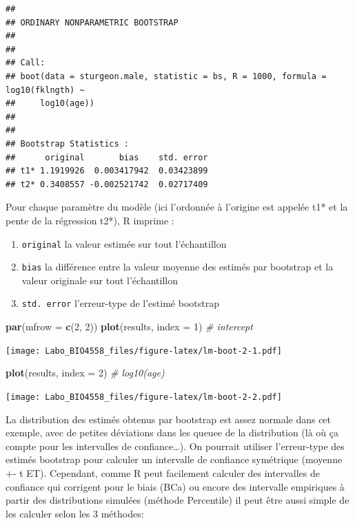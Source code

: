 \documentclass[
  12pt,
]{book}
\newenvironment{Shaded}{\begin{snugshade}}{\end{snugshade}}
\newcommand{\CommentTok}[1]{\textcolor[rgb]{0.56,0.35,0.01}{\textit{#1}}}
\newcommand{\DataTypeTok}[1]{\textcolor[rgb]{0.13,0.29,0.53}{#1}}
\newcommand{\DecValTok}[1]{\textcolor[rgb]{0.00,0.00,0.81}{#1}}
\newcommand{\KeywordTok}[1]{\textcolor[rgb]{0.13,0.29,0.53}{\textbf{#1}}}
\newcommand{\NormalTok}[1]{#1}
\providecommand{\tightlist}{%
  \setlength{\itemsep}{0pt}\setlength{\parskip}{0pt}}
\begin{document}
\begin{verbatim}
## 
## ORDINARY NONPARAMETRIC BOOTSTRAP
## 
## 
## Call:
## boot(data = sturgeon.male, statistic = bs, R = 1000, formula = log10(fklngth) ~ 
##     log10(age))
## 
## 
## Bootstrap Statistics :
##      original       bias    std. error
## t1* 1.1919926  0.003417942  0.03423899
## t2* 0.3408557 -0.002521742  0.02717409
\end{verbatim}

Pour chaque paramètre du modèle (ici l'ordonnée à l'origine est
appelée t1* et la pente de la régression t2*), R imprime :

\begin{enumerate}
\def\labelenumi{\arabic{enumi}.}
\tightlist
\item
  \texttt{original} la valeur estimée sur tout l'échantillon
\item
  \texttt{bias} la différence entre la valeur moyenne des estimés par bootstrap et la valeur originale sur tout l'échantillon
\item
  \texttt{std.\ error} l'erreur-type de l'estimé bootstrap
\end{enumerate}

\begin{Shaded}
\begin{Highlighting}[]
\KeywordTok{par}\NormalTok{(}\DataTypeTok{mfrow =} \KeywordTok{c}\NormalTok{(}\DecValTok{2}\NormalTok{, }\DecValTok{2}\NormalTok{))}
\KeywordTok{plot}\NormalTok{(results, }\DataTypeTok{index =} \DecValTok{1}\NormalTok{) }\CommentTok{\# intercept}
\end{Highlighting}
\end{Shaded}

\texttt{[image: Labo\_BIO4558\_files/figure-latex/lm-boot-2-1.pdf]}

\begin{Shaded}
\begin{Highlighting}[]
\KeywordTok{plot}\NormalTok{(results, }\DataTypeTok{index =} \DecValTok{2}\NormalTok{) }\CommentTok{\# log10(age)}
\end{Highlighting}
\end{Shaded}

\texttt{[image: Labo\_BIO4558\_files/figure-latex/lm-boot-2-2.pdf]}

La distribution des estimés obtenus par bootstrap est assez normale dans cet exemple, avec de petites déviations dans les queuee de la distribution (là où ça compte pour les intervalles de confiance\ldots). On pourrait utiliser l'erreur-type des estimés bootstrap pour calculer un intervalle de confiance symétrique (moyenne +- t ET). Cependant, comme R peut facilement calculer des intervalles de confiance qui corrigent pour le biais (BCa) ou encore des intervalle empiriques à partir des distributions simulées (méthode Percentile) il peut être aussi simple de les calculer selon les 3 méthodes:
\end{document}
